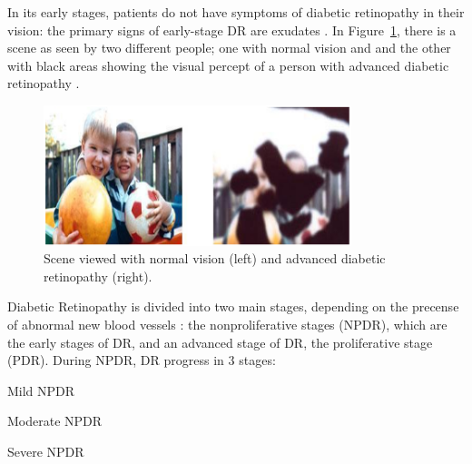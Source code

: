 In its early stages, patients do not have symptoms of diabetic retinopathy in their vision: the primary signs of early-stage DR are exudates \citep{nijalingappa2015machine}. In Figure~\ref{visionOfDrAndNodr}, there is a scene as seen by two different people; one with normal vision and and the other with black areas showing the visual percept of a person with advanced diabetic retinopathy \citep{NationalEyeInstitute}.

\begin{figure}[t]
\centering
\includegraphics[width=0.8\textwidth]{Figures/vision_of_dr_and_nodr}
\caption{Scene viewed with normal vision (left) and advanced diabetic retinopathy (right).}
\label{visionOfDrAndNodr}
\end{figure}

Diabetic Retinopathy is divided into two main stages, depending on the precense of abnormal new blood vessels  \citep{tang2011inflammation, nijalingappa2015machine}: the nonproliferative stages (NPDR), which are the early stages of DR, and an advanced stage of DR, the proliferative stage (PDR).
During NPDR, DR progress in 3 stages:
    \begin{compactenum}
        \item Mild NPDR
        \item Moderate NPDR
        \item Severe NPDR
    \end{compactenum}


